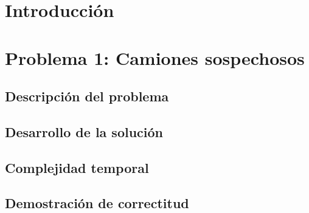 \documentclass[a4paper, 10pt, twoside]{article}
\begin{document}
\newpage



\tableofcontents

\newpage



\section{Introducción}


\newpage



\section{Problema 1: Camiones sospechosos}

\subsection{Descripción del problema}


\subsection{Desarrollo de la solución}


\subsection{Complejidad temporal}


\subsection{Demostración de correctitud}
\label{problema1-demostracion}

\end{document}
